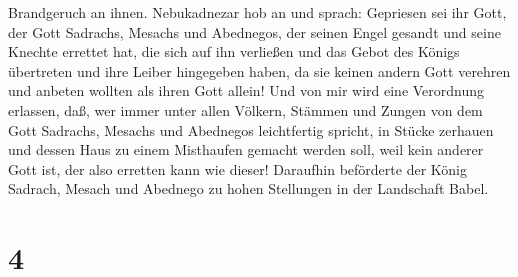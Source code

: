 Brandgeruch an ihnen.  Nebukadnezar hob an und sprach:
Gepriesen sei ihr Gott, der Gott Sadrachs, Mesachs und Abednegos, der
seinen Engel gesandt und seine Knechte errettet hat, die sich auf ihn
verließen und das Gebot des Königs übertreten und ihre Leiber hingegeben
haben, da sie keinen andern Gott verehren und anbeten wollten als ihren
Gott allein!  Und von mir wird eine Verordnung erlassen,
daß, wer immer unter allen Völkern, Stämmen und Zungen von dem Gott
Sadrachs, Mesachs und Abednegos leichtfertig spricht, in Stücke zerhauen
und dessen Haus zu einem Misthaufen gemacht werden soll, weil kein
anderer Gott ist, der also erretten kann wie dieser! 
Daraufhin beförderte der König Sadrach, Mesach und Abednego zu hohen
Stellungen in der Landschaft Babel.

\hypertarget{section-3}{%
\section{4}\label{section-3}}

